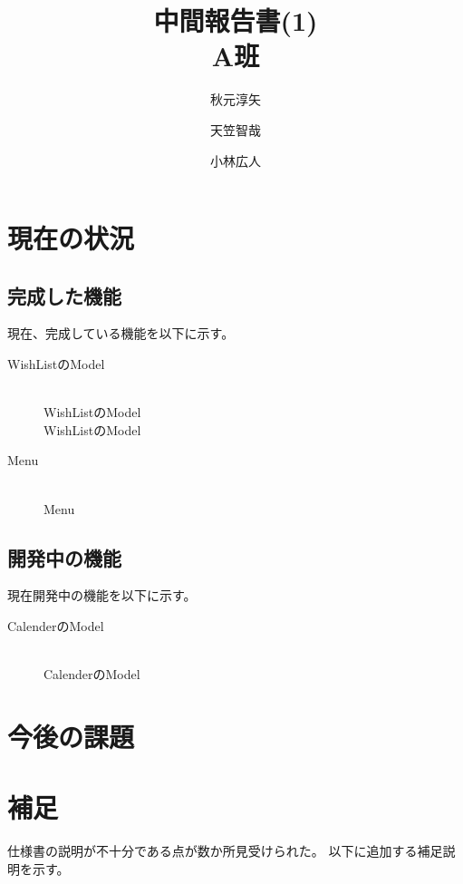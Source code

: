 ﻿\documentclass[a4j]{jarticle}
\title{中間報告書(1) \\ A班}
\author{秋元淳矢 \and 天笠智哉 \and 小林広人}
\date{}
\begin{document}
\maketitle

\section{現在の状況}
\subsection{完成した機能}
現在、完成している機能を以下に示す。
\begin{description}
	\item[WishListのModel] \mbox{} \\
		WishListのModel \\
		WishListのModel
	\item[Menu] \mbox{} \\
		Menu
\end{description}


\subsection{開発中の機能}
現在開発中の機能を以下に示す。
\begin{description}
	\item[CalenderのModel] \mbox{} \\
		CalenderのModel
\end{description}


\section{今後の課題}



\section{補足}
仕様書の説明が不十分である点が数か所見受けられた。
以下に追加する補足説明を示す。
\end{document}

